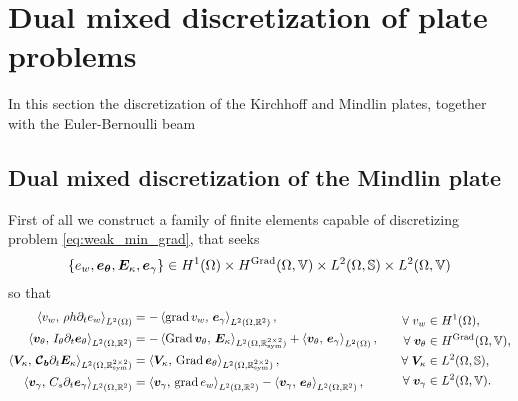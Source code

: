\section{Dual mixed discretization of plate problems}
In this section the discretization of the Kirchhoff and Mindlin plates, together with the Euler-Bernoulli beam

\subsection{Dual mixed discretization of the Mindlin plate}
First of all we construct a family of finite elements capable of discretizing problem \eqref{eq:weak_min_grad}, that seeks
$$\{e_w, \bm{e}_{\bm{\theta}}, \bm{E}_{\kappa}, \bm{e}_{\gamma}\} \in H^{1}(\Omega) \times H^{\Grad}(\Omega, \mathbb{V}) \times L^2(\Omega, \mathbb{S}) \times L^2(\Omega, \mathbb{V}) $$
so that 
\begin{equation}\label{eq:weak_min_grad_recall}
\begin{aligned}
\inner[L^2(\Omega)]{v_w}{\rho h \partial_t e_w} &= -\inner[L^2(\Omega, \mathbb{R}^{2})]{\grad v_w}{\bm{e}_\gamma}, \\
\inner[L^2(\Omega, \mathbb{R}^{2})]{\bm{v}_\theta}{I_\theta \partial_t \bm{e}_\theta} &= -\inner[L^2(\Omega, \mathbb{R}^{2\times 2}_{\text{sym}})]{\Grad \bm{v}_\theta}{\bm{E}_\kappa} + \inner[L^2(\Omega)]{\bm{v}_\theta}{\bm{e}_\gamma}, \\
\inner[L^2(\Omega, \mathbb{R}^{2\times 2}_{\text{sym}})]{\bm{V}_\kappa}{\bm{\mathcal{C}_b} \partial_t \bm{E}_\kappa} &= \inner[L^2(\Omega, \mathbb{R}^{2\times 2}_{\text{sym}})]{\bm{V}_\kappa}{\Grad \bm{e}_\theta}, \\
\inner[L^2(\Omega, \mathbb{R}^{2})]{\bm{v}_\gamma}{C_s \partial_t \bm{e}_\gamma} &= \inner[L^2(\Omega, \mathbb{R}^{2})]{\bm{v}_\gamma}{\grad e_w} - \inner[L^2(\Omega, \mathbb{R}^{2})]{\bm{v}_\gamma}{\bm{e}_\theta}, \\
\end{aligned} \qquad
\begin{aligned}
\forall\; v_w &\in H^{1}(\Omega), \\
\forall\; \bm{v}_\theta &\in H^{\Grad}(\Omega, \mathbb{V}), \\
\forall\; \bm{V}_\kappa &\in L^2(\Omega, \mathbb{S}), \\
\forall\; \bm{v}_\gamma &\in L^2(\Omega, \mathbb{V}).
\end{aligned}
\end{equation}

